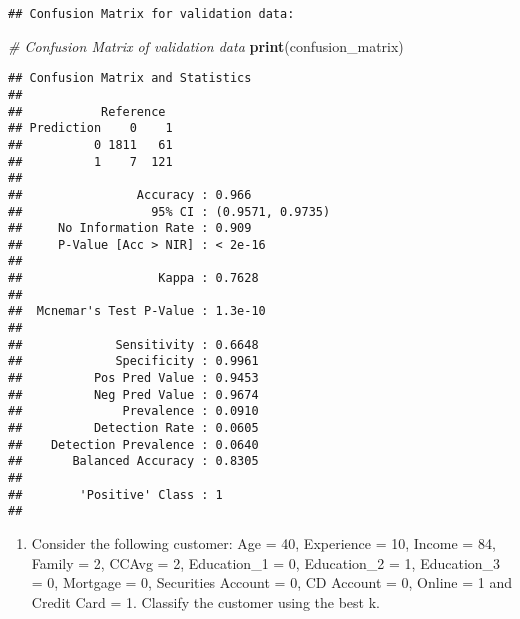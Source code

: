 \documentclass[
]{article}
\newenvironment{Shaded}{\begin{snugshade}}{\end{snugshade}}
\newcommand{\CommentTok}[1]{\textcolor[rgb]{0.56,0.35,0.01}{\textit{#1}}}
\newcommand{\FunctionTok}[1]{\textcolor[rgb]{0.13,0.29,0.53}{\textbf{#1}}}
\newcommand{\NormalTok}[1]{#1}
\providecommand{\tightlist}{%
  \setlength{\itemsep}{0pt}\setlength{\parskip}{0pt}}
\begin{document}
\begin{verbatim}
## Confusion Matrix for validation data:
\end{verbatim}

\begin{Shaded}
\begin{Highlighting}[]
\CommentTok{\# Confusion Matrix of validation data}
\FunctionTok{print}\NormalTok{(confusion\_matrix)}
\end{Highlighting}
\end{Shaded}

\begin{verbatim}
## Confusion Matrix and Statistics
## 
##           Reference
## Prediction    0    1
##          0 1811   61
##          1    7  121
##                                           
##                Accuracy : 0.966           
##                  95% CI : (0.9571, 0.9735)
##     No Information Rate : 0.909           
##     P-Value [Acc > NIR] : < 2e-16         
##                                           
##                   Kappa : 0.7628          
##                                           
##  Mcnemar's Test P-Value : 1.3e-10         
##                                           
##             Sensitivity : 0.6648          
##             Specificity : 0.9961          
##          Pos Pred Value : 0.9453          
##          Neg Pred Value : 0.9674          
##              Prevalence : 0.0910          
##          Detection Rate : 0.0605          
##    Detection Prevalence : 0.0640          
##       Balanced Accuracy : 0.8305          
##                                           
##        'Positive' Class : 1               
## 
\end{verbatim}

\begin{enumerate}
\def\labelenumi{\arabic{enumi}.}
\setcounter{enumi}{3}
\tightlist
\item
  Consider the following customer: Age = 40, Experience = 10, Income =
  84, Family = 2, CCAvg = 2, Education\_1 = 0, Education\_2 = 1,
  Education\_3 = 0, Mortgage = 0, Securities Account = 0, CD Account =
  0, Online = 1 and Credit Card = 1. Classify the customer using the
  best k.
\end{enumerate}
\end{document}
